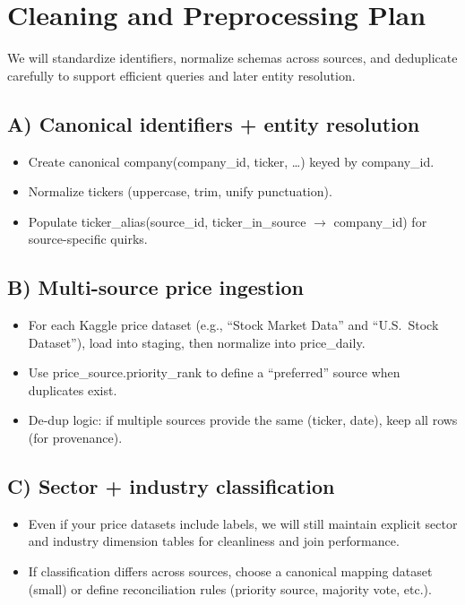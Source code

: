 \documentclass[11pt]{article}
\begin{document}
\section{Cleaning and Preprocessing Plan}

We will standardize identifiers, normalize schemas across sources, and deduplicate carefully to support efficient queries and later entity resolution.

\subsection{A) Canonical identifiers + entity resolution}

\begin{itemize}
    \item Create canonical company(company\_id, ticker, \ldots) keyed by company\_id.
    \item Normalize tickers (uppercase, trim, unify punctuation).
    \item Populate ticker\_alias(source\_id, ticker\_in\_source $\rightarrow$ company\_id) for source-specific quirks.
\end{itemize}

\subsection{B) Multi-source price ingestion}

\begin{itemize}
    \item For each Kaggle price dataset (e.g., ``Stock Market Data'' and ``U.S.\ Stock Dataset''), load into staging, then normalize into price\_daily.
    \item Use price\_source.priority\_rank to define a ``preferred'' source when duplicates exist.
    \item De-dup logic: if multiple sources provide the same (ticker, date), keep all rows (for provenance).
\end{itemize}

\subsection{C) Sector + industry classification}

\begin{itemize}
    \item Even if your price datasets include labels, we will still maintain explicit sector and industry dimension tables for cleanliness and join performance.
    \item If classification differs across sources, choose a canonical mapping dataset (small) or define reconciliation rules (priority source, majority vote, etc.).
\end{itemize}
\end{document}
